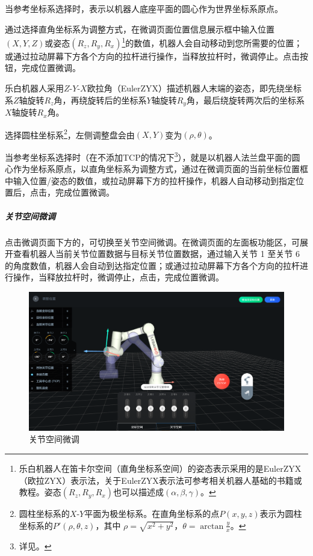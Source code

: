 当参考坐标系选择时，表示以机器人底座平面的圆心作为世界坐标系原点。

通过选择直角坐标系为调整方式，在微调页面位置信息展示框中输入位置$(X, Y, Z)$或姿态$(R_z, R_y, R_x)$\footnote{乐白机器人在笛卡尔空间（直角坐标系空间）的姿态表示采用的是EulerZYX（欧拉ZYX）表示法，关于EulerZYX表示法可参考相关机器人基础的书籍或教程。姿态$(R_z, R_y, R_x)$也可以描述成$(\alpha, \beta, \gamma)$。}的数值，机器人会自动移动到您所需要的位置；或通过拉动屏幕下方各个方向的拉杆进行操作，当释放拉杆时，微调停止。点击按钮，完成位置微调。

乐白机器人采用$Z\textrm{-}Y\textrm{-}X$欧拉角（EulerZYX）描述机器人末端的姿态，即先绕坐标系$Z$轴旋转$R_z$角，再绕旋转后的坐标系$Y$轴旋转$R_y$角，最后绕旋转两次后的坐标系$X$轴旋转$R_x$角。

选择圆柱坐标系\footnote{圆柱坐标系的$X\textrm{-}Y$平面为极坐标系。在直角坐标系的点$P(x, y, z)$表示为圆柱坐标系的$P'(\rho, \theta, z)$，其中 $\rho=\sqrt{x^2+y^2}$，$\theta=\arctan\frac{y}{x}$。}，左侧调整盘会由$(X, Y)$变为$(\rho, \theta)$。

当参考坐标系选择时（在不添加TCP的情况下\footnote{详见。}），就是以机器人法兰盘平面的圆心作为坐标系原点，以直角坐标系为调整方式，通过在微调页面的当前坐标位置框中输入位置/姿态的数值，或拉动屏幕下方的拉杆操作，机器人自动移动到指定位置后，点击，完成位置微调。

\subparagraph{关节空间微调}
点击微调页面下方的，可切换至关节空间微调。在微调页面的左面板功能区，可展开查看机器人当前关节位置数据与目标关节位置数据，通过输入关节 1 至关节 6 的角度数值，机器人会自动到达指定位置；或通过拉动屏幕下方各个方向的拉杆进行操作，当释放拉杆时，微调停止，点击，完成位置微调。


\begin{figure}[ht]
	\centering
	\includegraphics[width=\textwidth]{image/07/图3.10 关节空间微调.png}
	\caption{关节空间微调}
	\label{fig:关节空间微调}
\end{figure}

